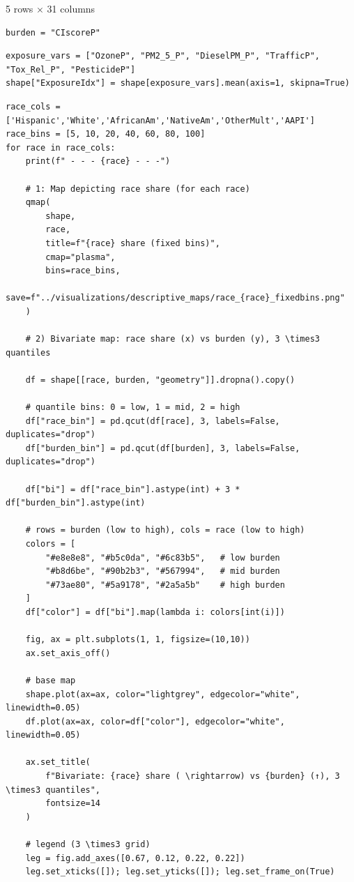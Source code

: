 \documentclass{article}
\begin{document}
\bigskip

5 rows $\times$ 31 columns

\begin{verbatim}
burden = "CIscoreP"
\end{verbatim}

\begin{verbatim}
exposure_vars = ["OzoneP", "PM2_5_P", "DieselPM_P", "TrafficP", "Tox_Rel_P", "PesticideP"]
shape["ExposureIdx"] = shape[exposure_vars].mean(axis=1, skipna=True)
\end{verbatim}

\begin{verbatim}
race_cols = ['Hispanic','White','AfricanAm','NativeAm','OtherMult','AAPI']
race_bins = [5, 10, 20, 40, 60, 80, 100]
for race in race_cols:
    print(f" - - - {race} - - -")

    # 1: Map depicting race share (for each race)
    qmap(
        shape,
        race,
        title=f"{race} share (fixed bins)",
        cmap="plasma",
        bins=race_bins,
        save=f"../visualizations/descriptive_maps/race_{race}_fixedbins.png"
    )

    # 2) Bivariate map: race share (x) vs burden (y), 3 \times3 quantiles

    df = shape[[race, burden, "geometry"]].dropna().copy()

    # quantile bins: 0 = low, 1 = mid, 2 = high
    df["race_bin"] = pd.qcut(df[race], 3, labels=False, duplicates="drop")
    df["burden_bin"] = pd.qcut(df[burden], 3, labels=False, duplicates="drop")

    df["bi"] = df["race_bin"].astype(int) + 3 * df["burden_bin"].astype(int)

    # rows = burden (low to high), cols = race (low to high)
    colors = [
        "#e8e8e8", "#b5c0da", "#6c83b5",   # low burden
        "#b8d6be", "#90b2b3", "#567994",   # mid burden
        "#73ae80", "#5a9178", "#2a5a5b"    # high burden
    ]
    df["color"] = df["bi"].map(lambda i: colors[int(i)])

    fig, ax = plt.subplots(1, 1, figsize=(10,10))
    ax.set_axis_off()

    # base map
    shape.plot(ax=ax, color="lightgrey", edgecolor="white", linewidth=0.05)
    df.plot(ax=ax, color=df["color"], edgecolor="white", linewidth=0.05)

    ax.set_title(
        f"Bivariate: {race} share ( \rightarrow) vs {burden} (↑), 3 \times3 quantiles",
        fontsize=14
    )

    # legend (3 \times3 grid)
    leg = fig.add_axes([0.67, 0.12, 0.22, 0.22])
    leg.set_xticks([]); leg.set_yticks([]); leg.set_frame_on(True)


\end{verbatim}
\end{document}
